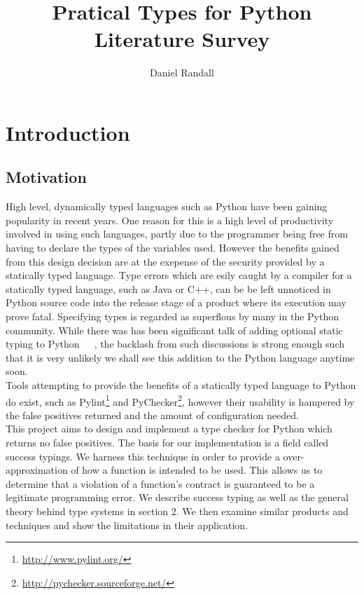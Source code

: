 \documentclass[12pt, titlepage]{article}
\title{Pratical Types for Python \\ Literature Survey}
\author{Daniel Randall}
\date{}
\begin{document}
\maketitle

\tableofcontents
\newpage

\section{Introduction}
\subsection{Motivation}
High level, dynamically typed languages such as Python have been gaining popularity in recent years. One reason for this is a high level of productivity involved in using such languages, partly due to the programmer being free from having to declare the types of the variables used. However the benefits gained from this design decision are at the exepense of the security provided by a statically typed language. Type errors which are esily caught by a compiler for a statically typed language, such as Java or C++, can be be left unnoticed in Python source code into the release stage of a product where its execution may prove fatal. Specifying types is regarded as superflous by many in the Python community. While there was has been significant talk of adding optional static typing to Python~\cite{guido1}~\cite{guido2}~\cite{guido3}, the backlash from such discussions is strong enough such that it is very unlikely we shall see this addition to the Python language anytime soon. \\
Tools attempting to provide the benefits of a statically typed language to Python do exist, such as Pylint\footnote{\url{http://www.pylint.org/}} and PyChecker\footnote{\url{http://pychecker.sourceforge.net/}}, however their usability is hampered by the false positives returned and the amount of configuration needed. \\
This project aims to design and implement a type checker for Python which returns no false positives. The basis for our implementation is a field called success typings. We harness this technique in order to provide a over-approximation of how a function is intended to be used. This allows us to determine that a violation of a function's contract is guaranteed to be a legitimate programming error. We describe success typing as well as the general theory behind type systems in section 2. We then examine similar products and techniques and show the limitations in their application. \\
\end{document}
